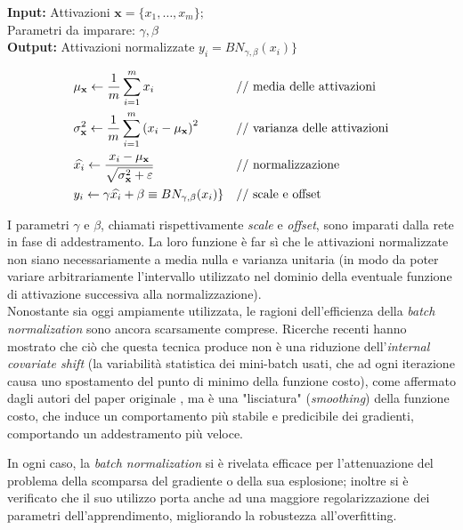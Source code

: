 \begin{adjustwidth}{3em}{0em}

\textbf{Input:} Attivazioni $\mathbf{x}=\{x_1,\dots,x_m\};$\\
Parametri da imparare: $\gamma, \beta$\\
\noindent \textbf{Output:} Attivazioni normalizzate $y_i = BN_{\gamma,\beta}(x_i)\}$

\begin{align}
& \mu_{\mathbf{x}}\leftarrow\frac{1}{m}\sum_{i=1}^m x_i && \text{// media delle attivazioni} \notag\\
& \sigma^2_{\mathbf{x}}\leftarrow\frac{1}{m}\sum_{i=1}^m \left(x_i-\mu_{\mathbf{x}}\right)^2 && \text{// varianza delle attivazioni} \notag\\
& \widehat{x_i}\leftarrow\frac{x_i-\mu_{\mathbf{x}}}{\sqrt{\sigma^2_{\mathbf{x}}+\varepsilon}} && \text{// normalizzazione} \notag\\
& y_i\leftarrow\gamma\widehat{x_i}+\beta\equiv BN_{\gamma,\beta}(x_i)\} && \text{// scale e offset} \notag
\label{eq:batchNorm}
\end{align}

\end{adjustwidth}

I parametri $\gamma$ e $\beta$, chiamati rispettivamente \textit{scale} e \textit{offset}, sono imparati dalla rete in fase di addestramento. La loro funzione è far sì che le attivazioni normalizzate non siano necessariamente a media nulla e varianza unitaria (in modo da poter variare arbitrariamente l'intervallo utilizzato nel dominio della eventuale funzione di attivazione successiva alla normalizzazione).\\

Nonostante sia oggi ampiamente utilizzata, le ragioni dell'efficienza della \textit{batch normalization} sono ancora scarsamente comprese. Ricerche recenti \cite{realBatchNorm} hanno mostrato che ciò che questa tecnica produce non è una riduzione dell'\textit{internal covariate shift} (la variabilità statistica dei mini-batch usati, che ad ogni iterazione causa uno spostamento del punto di minimo della funzione costo), come affermato dagli autori del paper originale \cite{batchNorm}, ma è una "lisciatura" (\textit{smoothing}) della funzione costo, che induce un comportamento più stabile e predicibile dei gradienti, comportando un addestramento più veloce.

In ogni caso, la \textit{batch normalization} si è rivelata efficace per l'attenuazione del problema della scomparsa del gradiente o della sua esplosione; inoltre si è verificato che il suo utilizzo porta anche ad una maggiore regolarizzazione dei parametri dell'apprendimento, migliorando la robustezza all'overfitting.

